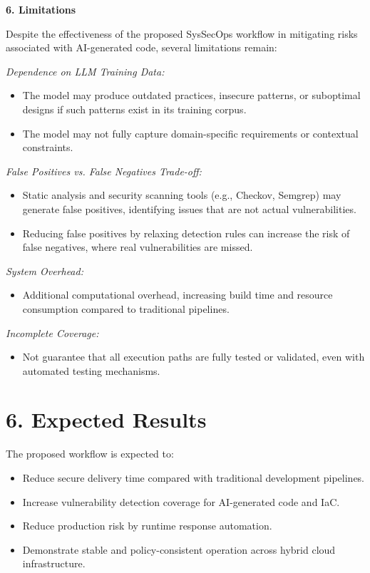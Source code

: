 \textbf{6. Limitations}

Despite the effectiveness of the proposed SysSecOps workflow in mitigating risks associated with
AI-generated code, several limitations remain:

\noindent\textit{Dependence on LLM Training Data:}
\begin{itemize}
    \item The model may produce outdated practices, insecure patterns, or suboptimal designs if such
    patterns exist in its training corpus.
    \item The model may not fully capture domain-specific requirements or contextual constraints.
\end{itemize}

\noindent\textit{False Positives vs. False Negatives Trade-off:}
\begin{itemize}
    \item Static analysis and security scanning tools (e.g., Checkov, Semgrep) may generate false
    positives, identifying issues that are not actual vulnerabilities.
    \item Reducing false positives by relaxing detection rules can increase the risk of false
    negatives, where real vulnerabilities are missed.
\end{itemize}

\noindent\textit{System Overhead:}
\begin{itemize}
    \item Additional computational overhead, increasing build time and resource consumption compared
    to traditional pipelines.
\end{itemize}

\noindent\textit{Incomplete Coverage:}
\begin{itemize}
    \item Not guarantee that all execution paths are fully tested or validated, even with automated
    testing mechanisms.
\end{itemize}

\section*{6. Expected Results}

The proposed workflow is expected to:
\begin{itemize}
    \item Reduce secure delivery time compared with traditional development pipelines.
    \item Increase vulnerability detection coverage for AI-generated code and IaC.
    \item Reduce production risk by runtime response automation.
    \item Demonstrate stable and policy-consistent operation across hybrid cloud infrastructure.
\end{itemize}

